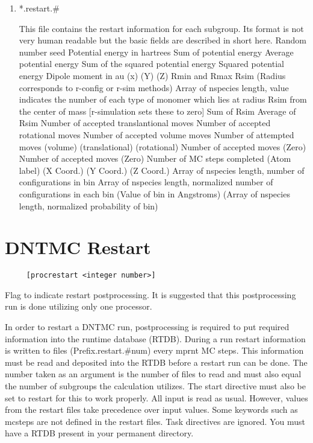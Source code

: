 \begin{enumerate}
\item *.restart.\#

This file contains the restart information for each subgroup.  Its
format is not very human readable but the basic fields are described
in short here. \subitem Random number seed \subitem Potential energy
in hartrees \subitem Sum of potential energy \subitem Average
potential energy \subitem Sum of the squared potential energy
\subitem Squared potential energy \subitem Dipole moment in au (x)
(Y) (Z) \subitem Rmin and Rmax \subitem Rsim (Radius corresponds to
r-config or r-sim methods) \subitem Array of nspecies length, value
indicates the number of each type of monomer which lies at radius
Rsim from the center of mass [r-simulation sets these to zero]
\subitem Sum of Rsim \subitem Average of Rsim \subitem Number of
accepted translantional moves \subitem Number of accepted rotational
moves \subitem Number of accepted volume moves \subitem Number of
attempted moves (volume) (translational) (rotational) \subitem
Number of accepted moves (Zero) \subitem Number of accepted moves
(Zero) \subitem Number of MC steps completed \subitem [1] (Atom
label) (X Coord.) (Y Coord.) (Z Coord.)  \subitem [2]
Array of nspecies length, number of configurations in bin \subitem
[3] Array of nspecies length, normalized number of configurations in
each bin \subitem [4] (Value of bin in Angstroms) (Array of nspecies
length, normalized probability of bin) 

\end{enumerate}

\section{DNTMC Restart}

\begin{verbatim}
     [procrestart <integer number>]
\end{verbatim}
Flag to indicate restart postprocessing.  It is suggested that this
postprocessing run is done utilizing only one processor.

In order to restart a DNTMC run, postprocessing is required to put
required information into the runtime database (RTDB). During a run
restart information is written to files (Prefix.restart.\#num) every
mprnt MC steps. This information must be read and deposited into the
RTDB before a restart run can be done.  The number taken as an
argument is the number of files to read and must also equal the
number of subgroups the calculation utilizes.  The start directive
must also be set to restart for this to work properly.  All input is
read as usual. However, values from the restart files take
precedence over input values. Some keywords such as mcsteps are not
defined in the restart files.  Task directives are ignored. You must
have a RTDB present in your permanent directory.

